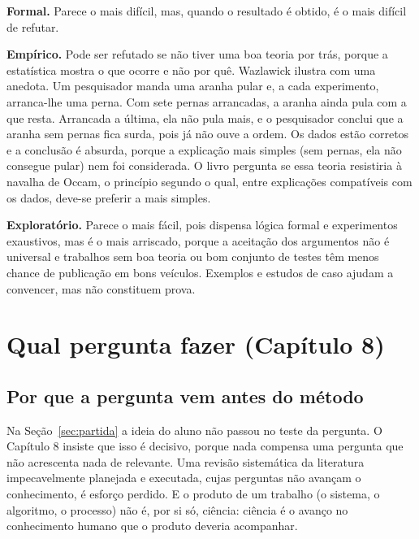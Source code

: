 \documentclass[10pt,a4paper]{extarticle}
\theoremstyle{definition}
\begin{document}
\begin{warnbox}
\textbf{Formal.} Parece o mais difícil, mas, quando o resultado é obtido, é o mais difícil de refutar.

\textbf{Empírico.} Pode ser refutado se não tiver uma boa teoria por trás, porque a estatística mostra o que ocorre e não por quê. Wazlawick ilustra com uma anedota. Um pesquisador manda uma aranha pular e, a cada experimento, arranca-lhe uma perna. Com sete pernas arrancadas, a aranha ainda pula com a que resta. Arrancada a última, ela não pula mais, e o pesquisador conclui que a aranha sem pernas fica surda, pois já não ouve a ordem. Os dados estão corretos e a conclusão é absurda, porque a explicação mais simples (sem pernas, ela não consegue pular) nem foi considerada. O livro pergunta se essa teoria resistiria à navalha de Occam, o princípio segundo o qual, entre explicações compatíveis com os dados, deve-se preferir a mais simples.

\textbf{Exploratório.} Parece o mais fácil, pois dispensa lógica formal e experimentos exaustivos, mas é o mais arriscado, porque a aceitação dos argumentos não é universal e trabalhos sem boa teoria ou bom conjunto de testes têm menos chance de publicação em bons veículos. Exemplos e estudos de caso ajudam a convencer, mas não constituem prova.
\end{warnbox}

\section{Qual pergunta fazer (Capítulo 8)}\label{sec:questoes}

\subsection{Por que a pergunta vem antes do método}

Na Seção~\ref{sec:partida} a ideia do aluno não passou no teste da pergunta. O Capítulo 8 insiste que isso é decisivo, porque nada compensa uma pergunta que não acrescenta nada de relevante. Uma revisão sistemática da literatura impecavelmente planejada e executada, cujas perguntas não avançam o conhecimento, é esforço perdido. E o produto de um trabalho (o sistema, o algoritmo, o processo) não é, por si só, ciência: ciência é o avanço no conhecimento humano que o produto deveria acompanhar.
\end{document}
